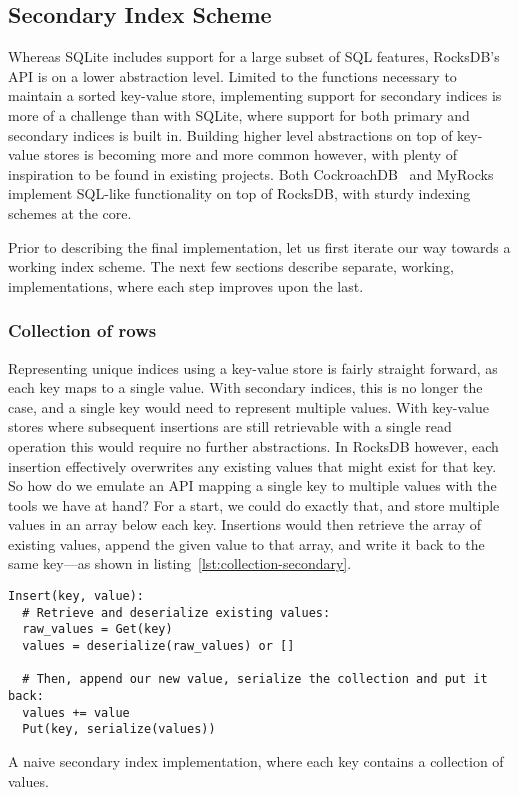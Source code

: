 \subsection{Secondary Index Scheme}

Whereas SQLite includes support for a large subset of SQL features, RocksDB's
API is on a lower abstraction level. Limited to the functions necessary to
maintain a sorted key-value store, implementing support for secondary indices is
more of a challenge than with SQLite, where support for both primary and
secondary indices is built in. Building higher level abstractions on top of
key-value stores is becoming more and more common however, with plenty of
inspiration to be found in existing projects. Both CockroachDB~\cite{cockroach}
and MyRocks~\cite{myrocks} implement SQL-like functionality on top of RocksDB,
with sturdy indexing schemes at the core.

Prior to describing the final implementation, let us first iterate our way
towards a working index scheme. The next few sections describe separate,
working, implementations, where each step improves upon the last.

\subsubsection{Collection of rows}

Representing unique indices using a key-value store is fairly straight forward,
as each key maps to a single value. With secondary indices, this is no longer
the case, and a single key would need to represent multiple values. With
key-value stores where subsequent insertions are still retrievable with a single
read operation this would require no further abstractions. In RocksDB however,
each insertion effectively overwrites any existing values that might exist for
that key. So how do we emulate an API mapping a single key to multiple values
with the tools we have at hand? For a start, we could do exactly that, and store
multiple values in an array below each key. Insertions would then retrieve the
array of existing values, append the given value to that array, and write it
back to the same key---as shown in listing~\ref{lst:collection-secondary}.

\begin{listing}[H]
  \begin{verbatim}
Insert(key, value):
  # Retrieve and deserialize existing values:
  raw_values = Get(key)
  values = deserialize(raw_values) or []

  # Then, append our new value, serialize the collection and put it back:
  values += value
  Put(key, serialize(values))
  \end{verbatim}

  \caption{A naive secondary index implementation, where each key contains a
  collection of values.}\label{lst:collection-secondary}
\end{listing}

